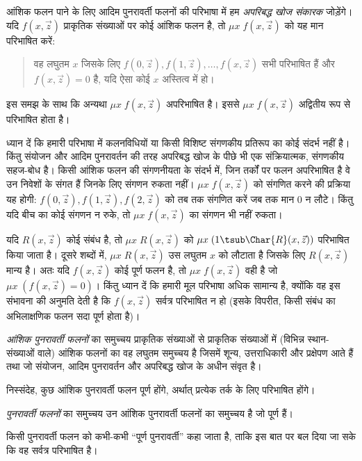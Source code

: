 \documentclass[../../../include/open-logic-section]{subfiles}
\begin{document}
आंशिक फलन पाने के लिए आदिम पुनरावर्ती फलनों की परिभाषा में हम
\emph{अपरिबद्ध खोज संकारक} जोड़ेंगे। यदि $f(x,\vec z)$ प्राकृतिक
संख्याओं पर कोई आंशिक फलन है, तो $\mu x \; f(x,\vec z)$ को यह मान
परिभाषित करें:
\begin{quote}
  वह लघुतम $x$ जिसके लिए $f(0,\vec z), f(1,\vec z), \dots, f(x,\vec
  z)$ सभी परिभाषित हैं और $f(x,\vec z) = 0$ है, यदि ऐसा कोई $x$
  अस्तित्व में हो।
\end{quote}
इस समझ के साथ कि अन्यथा $\mu x \; f(x,\vec z)$ अपरिभाषित है। इससे
$\mu x \; f(x,\vec z)$ अद्वितीय रूप से परिभाषित होता है।

\begin{explain}
ध्यान दें कि हमारी परिभाषा में कलनविधियों
या किसी विशिष्ट संगणकीय प्रतिरूप का कोई संदर्भ नहीं है। किंतु संयोजन और
आदिम पुनरावर्तन की तरह अपरिबद्ध खोज के पीछे भी एक संक्रियात्मक, संगणकीय
सहज-बोध है। किसी आंशिक फलन की संगणनीयता के संदर्भ में, जिन तर्कों पर फलन
अपरिभाषित है वे उन निवेशों के संगत हैं जिनके लिए संगणन रुकता नहीं।
$\mu x \;
f(x,\vec z)$ को संगणित करने की प्रक्रिया यह होगी:
$f(0,\vec z), f(1,\vec z),
f(2,\vec z)$ को तब तक संगणित करें जब तक मान
0 न लौटे। किंतु यदि बीच का कोई संगणन न रुके, तो
$\mu x \; f(x,\vec z)$ का संगणन भी नहीं रुकता।
\end{explain}

यदि $R(x,\vec z)$ कोई संबंध है, तो $\mu x \; R(x,\vec z)$ को
$\mu x \; (1 \tsub \Char{R}(x,\vec z))$ परिभाषित किया जाता है। दूसरे
शब्दों में, $\mu x \;
R(x,\vec z)$ उस लघुतम $x$ को लौटाता है जिसके लिए
$R(x,\vec z)$ मान्य है। अतः यदि $f(x,\vec z)$ कोई पूर्ण फलन है, तो
$\mu x \; f(x,\vec
z)$ वही है जो $\mu x \; (f(x,\vec z) = 0)$। किंतु
ध्यान दें कि हमारी मूल परिभाषा अधिक सामान्य है, क्योंकि वह इस संभावना
की अनुमति देती है कि $f(x,\vec z)$ सर्वत्र परिभाषित न हो (इसके विपरीत,
किसी संबंध का अभिलाक्षणिक फलन सदा पूर्ण होता है)।

\begin{defn}
\emph{आंशिक पुनरावर्ती फलनों} का समुच्चय प्राकृतिक संख्याओं से प्राकृतिक
संख्याओं में (विभिन्न स्थान-संख्याओं वाले) आंशिक फलनों का वह लघुतम
समुच्चय है जिसमें शून्य, उत्तराधिकारी और प्रक्षेपण आते हैं तथा जो संयोजन,
आदिम पुनरावर्तन और अपरिबद्ध खोज के अधीन संवृत है।
\end{defn}

निस्संदेह, कुछ आंशिक पुनरावर्ती फलन पूर्ण होंगे, अर्थात् प्रत्येक तर्क
के लिए परिभाषित होंगे।

\begin{defn}
\emph{पुनरावर्ती फलनों} का समुच्चय उन आंशिक पुनरावर्ती फलनों का समुच्चय
है जो पूर्ण हैं।
\end{defn}

किसी पुनरावर्ती फलन को कभी-कभी ``पूर्ण पुनरावर्ती'' कहा जाता है, ताकि इस
बात पर बल दिया जा सके कि वह सर्वत्र परिभाषित है।
\end{document}
